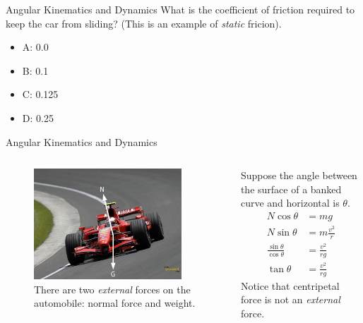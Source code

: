 \documentclass{beamer}
\begin{document}
\begin{frame}{Angular Kinematics and Dynamics}
What is the coefficient of friction required to keep the car from sliding?  (This is an example of \textit{static} fricion).
\begin{itemize}
\item A: 0.0
\item B: 0.1
\item C: 0.125
\item D: 0.25
\end{itemize}
\end{frame}

\begin{frame}{Angular Kinematics and Dynamics}
\begin{columns}[T]
\begin{column}{0.5\textwidth}
\begin{figure}
\centering
\includegraphics[width=0.9\textwidth]{figures/ferari.pdf}
\caption{\label{fig:ferari} There are two \alert{\textit{external}} forces on the automobile: normal force and weight.}
\end{figure}
\end{column}
\begin{column}{0.5\textwidth}
\small
Suppose the angle between the surface of a banked curve and horizontal is $\theta$.
\begin{align}
N\cos\theta &= mg \\
N\sin\theta &= m\frac{v^2}{r} \\
\frac{\sin\theta}{\cos\theta} &= \frac{v^2}{rg} \\
\tan\theta &= \frac{v^2}{rg}
\end{align}
Notice that centripetal force is not an \textit{external} force.
\end{column}
\end{columns}
\end{frame}
\end{document}
